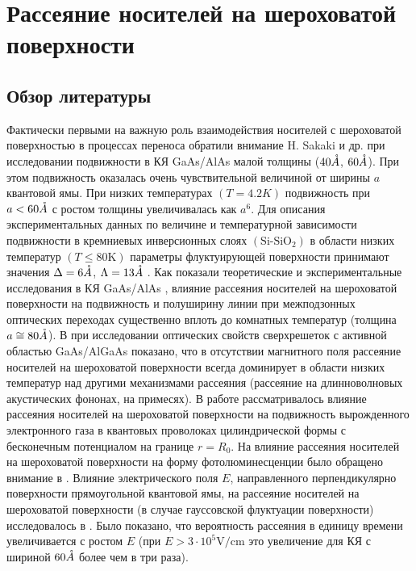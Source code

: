\chapter{Рассеяние носителей на шероховатой поверхности} \label{chapt1}

\section{Обзор литературы} \label{sect1_1}
Фактически первыми на важную роль взаимодействия носителей с шероховатой поверхностью в процессах переноса обратили внимание H. Sakaki и др. \cite{Sakaki1987} при исследовании подвижности в КЯ GaAs/AlAs малой толщины ($40\AA$, $60\AA$). При этом подвижность оказалась очень чувствительной величиной от ширины $a$ квантовой ямы. При низких температурах $(T = 4.2 K)$ подвижность при  $a < 60 \AA$ с ростом толщины увеличивалась как $a^{6}$. Для описания экспериментальных данных по величине и температурной зависимости подвижности в кремниевых инверсионных слоях $(\text{Si-SiO}_2)$ в области низких температур $(T\le 80 \text{K})$ параметры флуктуирующей поверхности принимают значения $\Delta = 6\AA$, $\Lambda = 13\AA$ \cite{Stern1980, Cham1980}. Как показали теоретические и экспериментальные исследования в КЯ GaAs/AlAs \cite{Unuma2001}, влияние рассеяния носителей на шероховатой поверхности на подвижность и полуширину линии при межподзонных оптических переходах существенно вплоть до комнатных температур (толщина $a \cong 80 \AA$). В \cite{Leuliet2006} при исследовании оптических свойств сверхрешеток с активной областью GaAs/AlGaAs показано, что в отсутствии магнитного поля рассеяние носителей на шероховатой поверхности всегда доминирует в области низких температур над другими механизмами рассеяния (рассеяние на длинноволновых акустических фононах, на примесях). В работе \cite{Gold1990} рассматривалось влияние рассеяния носителей на шероховатой поверхности на подвижность вырожденного электронного газа в квантовых проволоках цилиндрической формы с бесконечным потенциалом на границе $r=R_0 $. На влияние рассеяния носителей на шероховатой поверхности на форму фотолюминесценции было обращено внимание в \cite{Gurioli1991}. Влияние электрического поля $E$, направленного перпендикулярно поверхности прямоугольной квантовой ямы, на рассеяние носителей на шероховатой поверхности (в случае гауссовской флуктуации поверхности) исследовалось в \cite{Ibragimov2002}. Было показано, что вероятность рассеяния в единицу времени увеличивается с ростом $E$ (при $E>3\cdot 10^5 \text{V/cm}$ это увеличение для КЯ с шириной $60 \AA$ более чем в три раза).

